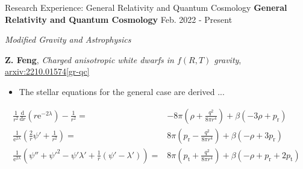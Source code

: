 \documentclass[9pt,aspectratio=169,hyperref=colorlinks]{beamer}
\begin{document}
\begin{frame}{Research Experience: General Relativity and Quantum Cosmology}
    \textbf{General Relativity and Quantum Cosmology} \hfill Feb. 2022 - Present

    \smallskip \quad \textit{Modified Gravity and Astrophysics}

    \textbf{Z. Feng}, \textit{Charged anisotropic white dwarfs in $f\left({R}, {T}\right)$ gravity}, \href{https://arxiv.org/abs/2210.01574}{arxiv:2210.01574[gr-qc]}

    \begin{itemize}
        \item The stellar equations for the general case are derived ...
    \end{itemize}

    \begin{align*}
        \frac{1}{r^2} \frac{\mathrm{d}}{\mathrm{d} r}\left(r \mathrm{e}^{- 2 \lambda}\right) - \frac{1}{r^2} =                       & - 8 \pi \left(\rho + \frac{q^2}{8 \pi r^4}\right) + \beta (- 3 \rho + p_{\text{r}})                      \\
        \frac{1}{\mathrm{e}^{2 \lambda}}(\frac{2}{r} \psi' + \frac{1}{r^2}) =                                                        & 8 \pi \left(p_{\text{r}} - \frac{q^2}{8 \pi r^4}\right) + \beta (- \rho + 3 p_{\text{r}})                \\
        \frac{1}{\mathrm{e}^{2 \lambda}} \left(\psi'' + \psi'^2 - \psi' \lambda' + \frac{1}{r}\left(\psi' - \lambda'\right)\right) = & 8 \pi \left(p_{\text{t}} + \frac{q^2}{8 \pi r^4}\right) + \beta (- \rho + p_{\text{r}} + 2 p_{\text{t}})
    \end{align*}
\end{frame}
\end{document}
